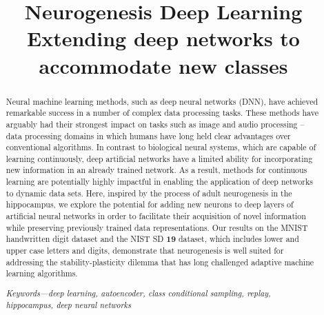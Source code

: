 \documentclass[10pt,conference]{IEEEtran}
\begin{document}
\title{Neurogenesis Deep Learning \\ {\large Extending deep networks to accommodate new classes}}
\author{ 
 }
\maketitle
\begin{abstract}
Neural machine learning methods, such as deep neural networks (DNN), have achieved remarkable success in a number of complex data processing tasks. These methods have arguably had their strongest impact on tasks such as image and audio processing – data processing domains in which humans have long held clear advantages over conventional algorithms. In contrast to biological neural systems, which are capable of learning continuously, deep artificial networks have a limited ability for incorporating new information in an already trained network. As a result, methods for continuous learning are potentially highly impactful in enabling the application of deep networks to dynamic data sets. Here, inspired by the process of adult neurogenesis in the hippocampus, we explore the potential for adding new neurons to deep layers of artificial neural networks in order to facilitate their acquisition of novel information while preserving previously trained data representations. Our results on the MNIST handwritten digit dataset and the NIST SD $\mathbf{19}$ dataset, which includes lower and upper case letters and digits, demonstrate that neurogenesis is well suited for addressing the stability-plasticity dilemma that has long challenged adaptive machine learning algorithms.

\textit{Keywords---deep learning, autoencoder, class conditional sampling, replay, hippocampus, deep neural networks}
\end{abstract}
\end{document}
